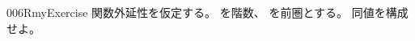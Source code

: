 \documentclass[index]{subfiles}
\begin{document}
\begin{myBlock}{006R}{myExercise}
  関数外延性を仮定する。
  を階数、
  を前圏とする。
  同値を構成せよ。
\end{myBlock}
\end{document}
